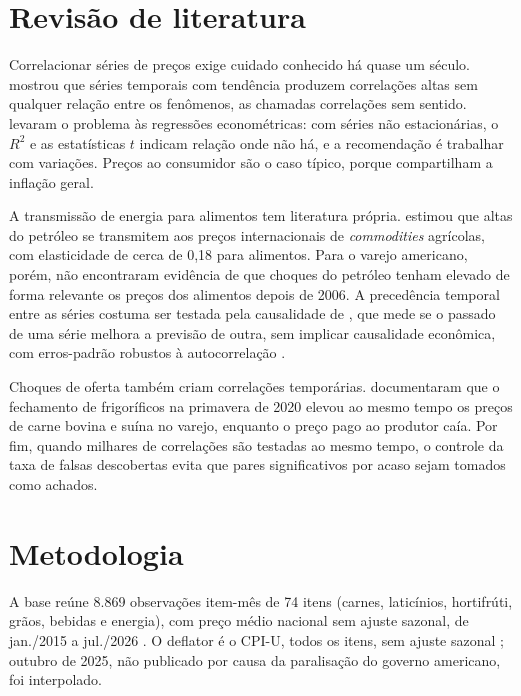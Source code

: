 \documentclass[
  article,            %
  12pt,
  oneside,
  a4paper,
  section=TITLE,      %
  english,            %
  brazil              %
]{abntex2}
\begin{document}
\section{Revisão de literatura}

Correlacionar séries de preços exige cuidado conhecido há quase um século.  mostrou que séries temporais com tendência produzem correlações altas sem qualquer relação entre os fenômenos, as chamadas correlações sem sentido.  levaram o problema às regressões econométricas: com séries não estacionárias, o $R^2$ e as estatísticas $t$ indicam relação onde não há, e a recomendação é trabalhar com variações. Preços ao consumidor são o caso típico, porque compartilham a inflação geral.

A transmissão de energia para alimentos tem literatura própria.  estimou que altas do petróleo se transmitem aos preços internacionais de \textit{commodities} agrícolas, com elasticidade de cerca de 0,18 para alimentos. Para o varejo americano, porém,  não encontraram evidência de que choques do petróleo tenham elevado de forma relevante os preços dos alimentos depois de 2006. A precedência temporal entre as séries costuma ser testada pela causalidade de , que mede se o passado de uma série melhora a previsão de outra, sem implicar causalidade econômica, com erros-padrão robustos à autocorrelação \cite{newey1987}.

Choques de oferta também criam correlações temporárias.  documentaram que o fechamento de frigoríficos na primavera de 2020 elevou ao mesmo tempo os preços de carne bovina e suína no varejo, enquanto o preço pago ao produtor caía. Por fim, quando milhares de correlações são testadas ao mesmo tempo, o controle da taxa de falsas descobertas \cite{benjamini1995} evita que pares significativos por acaso sejam tomados como achados.

\section{Metodologia}

A base reúne 8.869 observações item-mês de 74 itens (carnes, laticínios, hortifrúti, grãos, bebidas e energia), com preço médio nacional sem ajuste sazonal, de jan./2015 a jul./2026 \cite{bls2026}. O deflator é o CPI-U, todos os itens, sem ajuste sazonal \cite{fred2026}; outubro de 2025, não publicado por causa da paralisação do governo americano, foi interpolado.
\end{document}
